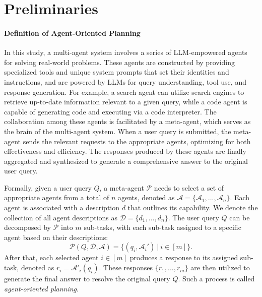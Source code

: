 \section{Preliminaries}
\label{preliminaries}
\paragraph{Definition of Agent-Oriented Planning}

In this study, a multi-agent system involves a series of LLM-empowered agents for solving real-world problems.
These agents are constructed by providing specialized tools and unique system prompts that set their identities and instructions, and are powered by LLMs for query understanding, tool use, and response generation.
For example, a search agent can utilize search engines to retrieve up-to-date information relevant to a given query, while a code agent is capable of generating code and executing via a code interpreter.
The collaboration among these agents is facilitated by a meta-agent, which serves as the brain of the multi-agent system.
When a user query is submitted, the meta-agent sends the relevant requests to the appropriate agents, optimizing for both effectiveness and efficiency. The responses produced by these agents are finally aggregated and synthesized to generate a comprehensive answer to the original user query.

Formally, given a user query $Q$, a meta-agent $\mathcal{P}$ needs to select a set of appropriate agents from a total of $n$ agents, denoted as $\mathcal{A}=\{\mathcal{A}_1, ..., \mathcal{A}_n\}$. Each agent is associated with a description $d$ that outlines its capability. We denote the collection of all agent descriptions as $\mathcal{D} = \{d_1,...,d_n\}$.
The user query $Q$ can be decomposed by $\mathcal{P}$ into $m$ sub-tasks, with each sub-task assigned to a specific agent based on their descriptions: 
\begin{equation}
    \mathcal{P}(Q, \mathcal{D}, \mathcal{A})=\{(q_i, \mathcal{A}_i')\ |\ i \in [m]\}. 
\end{equation}
After that, each selected agent $i \in [m]$ produces a response to its assigned sub-task, denoted as $r_i=\mathcal{A}'_i(q_i) $. These responses $\{r_1,...,r_m\}$ are then utilized to generate the final answer to resolve the original query $Q$. 
Such a process is called {\it agent-oriented planning}.

